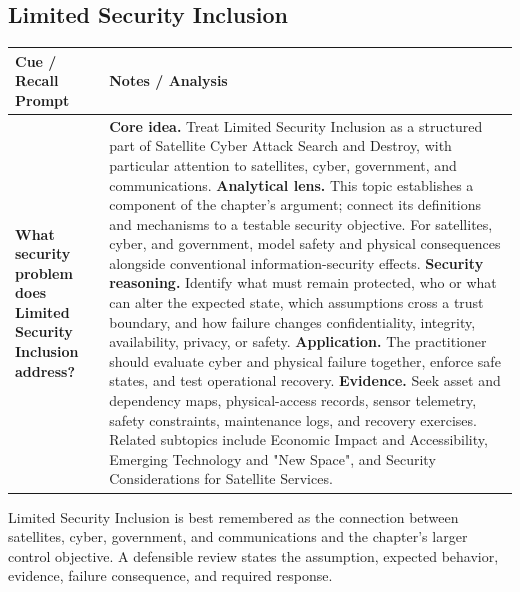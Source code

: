 \documentclass[11pt]{article}
\newcommand{\CornellHeader}{%
\rowcolor{Navy}\color{white}\bfseries Cue / Recall Prompt & \color{white}\bfseries Notes / Analysis\\\hline}
\newcommand{\CornellRow}[2]{%
\cellcolor{CueGray}\RaggedRight\textbf{#1} & \RaggedRight #2\\\hline}
\begin{document}
\subsection*{Limited Security Inclusion}
\begin{longtable}{>{\RaggedRight\arraybackslash}p{}|>{\RaggedRight\arraybackslash}p{}}
\CornellHeader
\CornellRow{What security problem does Limited Security Inclusion address?}{\textbf{Core idea.} Treat Limited Security Inclusion as a structured part of Satellite Cyber Attack Search and Destroy, with particular attention to satellites, cyber, government, and communications. \textbf{Analytical lens.} This topic establishes a component of the chapter's argument; connect its definitions and mechanisms to a testable security objective. For satellites, cyber, and government, model safety and physical consequences alongside conventional information-security effects. \textbf{Security reasoning.} Identify what must remain protected, who or what can alter the expected state, which assumptions cross a trust boundary, and how failure changes confidentiality, integrity, availability, privacy, or safety. \textbf{Application.} The practitioner should evaluate cyber and physical failure together, enforce safe states, and test operational recovery. \textbf{Evidence.} Seek asset and dependency maps, physical-access records, sensor telemetry, safety constraints, maintenance logs, and recovery exercises. Related subtopics include Economic Impact and Accessibility, Emerging Technology and "New Space", and Security Considerations for Satellite Services.}
\end{longtable}
\begin{topicsummary}
Limited Security Inclusion is best remembered as the connection between satellites, cyber, government, and communications and the chapter's larger control objective. A defensible review states the assumption, expected behavior, evidence, failure consequence, and required response.
\end{topicsummary}
\end{document}
